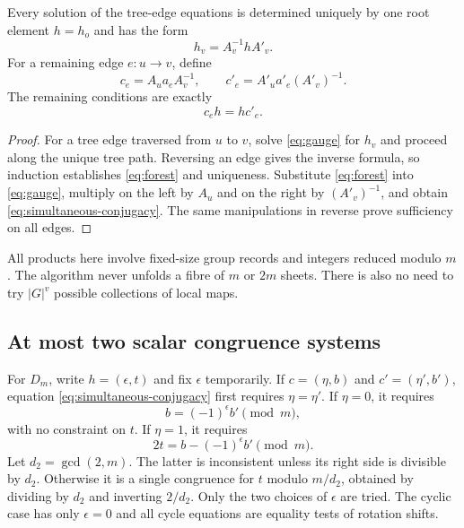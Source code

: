 \begin{theorem}
\label{thm:forest}
Every solution of the tree-edge equations is determined uniquely by one
root element $h=h_o$ and has the form
\begin{equation}
 h_v=A_v^{-1}hA'_v.\label{eq:forest}
\end{equation}
For a remaining edge $e:u\to v$, define
\[
 c_e=A_u a_e A_v^{-1},\qquad
 c'_e=A'_u a'_e(A'_v)^{-1}.
\]
The remaining conditions are exactly
\begin{equation}
 c_eh=hc'_e.\label{eq:simultaneous-conjugacy}
\end{equation}
\end{theorem}
\begin{proof}
For a tree edge traversed from $u$ to $v$, solve \eqref{eq:gauge} for $h_v$ and proceed
along the unique tree path. Reversing an edge gives the inverse formula, so
induction establishes \eqref{eq:forest} and uniqueness. Substitute \eqref{eq:forest} into \eqref{eq:gauge}, multiply
on the left by $A_u$ and on the right by $(A'_v)^{-1}$, and obtain \eqref{eq:simultaneous-conjugacy}.
The same manipulations in reverse prove sufficiency on all edges.
\end{proof}

All products here involve fixed-size group records and integers reduced
modulo $m$. The algorithm never unfolds a fibre of $m$ or $2m$ sheets.
There is also no need to try $|G|^v$ possible collections of local maps.

\subsection{At most two scalar congruence systems}

For $D_m$, write $h=(\epsilon,t)$ and fix $\epsilon$ temporarily.
If $c=(\eta,b)$ and $c'=(\eta',b')$, equation \eqref{eq:simultaneous-conjugacy} first requires
$\eta=\eta'$. If $\eta=0$, it requires
\begin{equation}
 b=(-1)^\epsilon b'\pmod m,
 \label{eq:rotation-condition}
\end{equation}
with no constraint on $t$. If $\eta=1$, it requires
\begin{equation}
 2t=b-(-1)^\epsilon b'\pmod m.
 \label{eq:reflection-condition}
\end{equation}
Let $d_2=\gcd(2,m)$. The latter is inconsistent unless its right side is
divisible by $d_2$. Otherwise it is a single congruence for $t$ modulo
$m/d_2$, obtained by dividing by $d_2$ and inverting $2/d_2$.
Only the two choices of $\epsilon$ are tried. The cyclic case has only
$\epsilon=0$ and all cycle equations are equality tests of rotation shifts.

